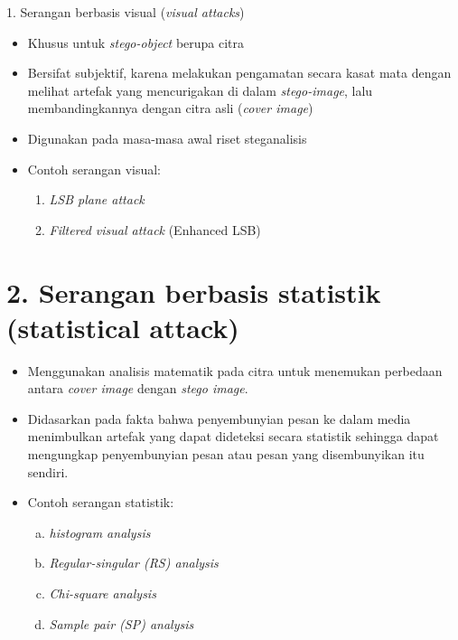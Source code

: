 \documentclass{article}
\begin{document}
1. Serangan berbasis visual (\textit{visual attacks})
\begin{itemize}
    \item Khusus untuk \textit{stego-object} berupa citra
    \item Bersifat subjektif, karena melakukan pengamatan secara kasat mata dengan melihat artefak yang mencurigakan di dalam \textit{stego-image}, lalu membandingkannya dengan citra asli (\textit{cover image})
    \item Digunakan pada masa-masa awal riset steganalisis
    \item Contoh serangan visual:
    \begin{enumerate}
        \item \textit{LSB plane attack}
        \item \textit{Filtered visual attack} (Enhanced LSB)
    \end{enumerate}
\end{itemize}

\newpage


\section*{2. Serangan berbasis statistik (statistical attack)}

\begin{itemize}
    \item Menggunakan analisis matematik pada citra untuk menemukan perbedaan antara \textit{cover image} dengan \textit{stego image}.
    \item Didasarkan pada fakta bahwa penyembunyian pesan ke dalam media menimbulkan artefak yang dapat dideteksi secara statistik sehingga dapat mengungkap penyembunyian pesan atau pesan yang disembunyikan itu sendiri.
    \item Contoh serangan statistik:
    \begin{enumerate}[a.]
        \item \textit{histogram analysis}
        \item \textit{Regular-singular (RS) analysis}
        \item \textit{Chi-square analysis}
        \item \textit{Sample pair (SP) analysis}
    \end{enumerate}
\end{itemize}

\newpage
\end{document}
